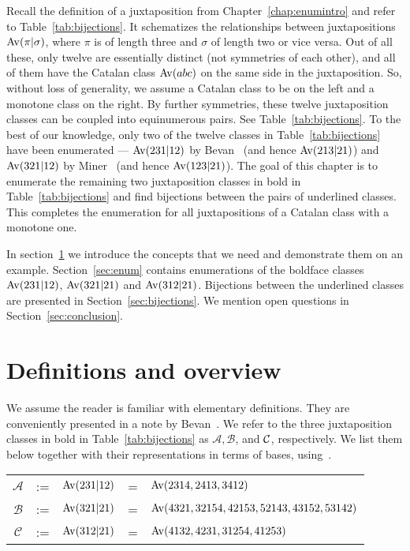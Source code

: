 \documentclass[12pt, a4paper, twoside]{report}
\begin{document}
Recall the definition of a juxtaposition from Chapter~\ref{chap:enumintro} and refer to Table~\ref{tab:bijections}. It schematizes the relationships between juxtapositions $\mathrm{Av}(\pi|\sigma)$, where $\pi$ is of length three and $\sigma$ of length two or vice versa. Out of all these, only twelve are essentially distinct (not symmetries of each other), and all of them have the Catalan class $\mathrm{Av}(abc)$ on the same side in the juxtaposition. So, without loss of generality, we assume a Catalan class to be on the left and a monotone class on the right. By further symmetries, these twelve juxtaposition classes can be coupled into equinumerous pairs. See Table~\ref{tab:bijections}. To the best of our knowledge, only two of the twelve classes in Table~\ref{tab:bijections} have been enumerated --- $\mathrm{Av}(231|12)$ by Bevan~\cite{bevan-new} (and hence $\mathrm{Av}(213|21)$) and $\mathrm{Av}(321|12)$ by Miner~\cite{miner16twobyfour} (and hence $\mathrm{Av}(123|21)$). The goal of this chapter is to enumerate the remaining two juxtaposition classes in bold in Table~\ref{tab:bijections} and find bijections between the pairs of underlined classes. This completes the enumeration for all juxtapositions of a Catalan class with a monotone one.

In section~\ref{sec:catalanjuxt_defs} we introduce the concepts that we need and demonstrate them on an example. Section~\ref{sec:enum} contains enumerations of the boldface classes $\mathrm{Av}(231|12)$, $\mathrm{Av}(321|21)$ and $\mathrm{Av}(312|21)$.  Bijections between the underlined classes are presented in Section~\ref{sec:bijections}. We mention open questions in Section~\ref{sec:conclusion}.

\section{Definitions and overview}
\label{sec:catalanjuxt_defs}
We assume the reader is familiar with elementary definitions. They are conveniently presented in a note by Bevan~\cite{bevan2015defs}.  We refer to the three juxtaposition classes in bold in Table~\ref{tab:bijections} as $\mathcal{A}, \mathcal{B}$, and $\mathcal{C}$, respectively. We list them below together with their representations in terms of bases, using~\cite{atkinson1997restricted}.

\begin{center}
\begin{tabular}{c c c c l}
$\mathcal{A}$&:= & $\mathrm{Av}(231|12)$ & = & $\mathrm{Av}(2314, 2413, 3412)$ \\
$\mathcal{B}$&:= & $\mathrm{Av}(321|21)$ & = & $\mathrm{Av}(4321, 32154, 42153, 52143, 43152, 53142)$ \\
$\mathcal{C}$&:= & $\mathrm{Av}(312|21)$ & = & $\mathrm{Av}(4132, 4231, 31254, 41253)$\\  %
\end{tabular}
\end{center}
\end{document}
